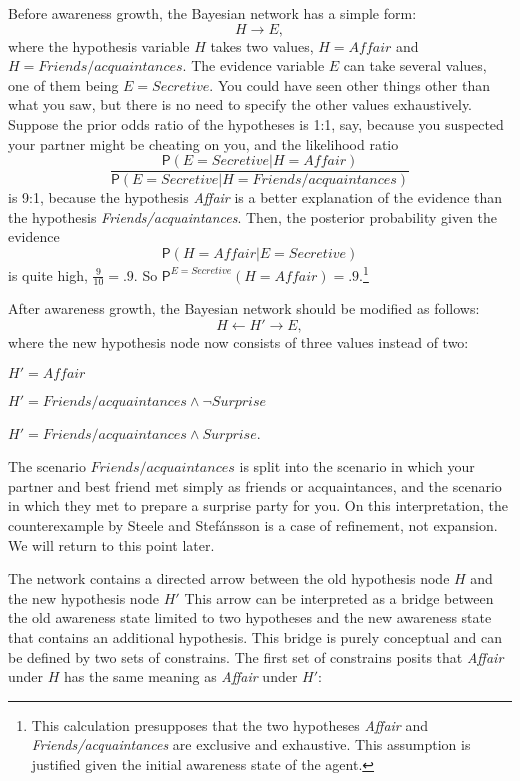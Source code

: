 \documentclass[
  11pt,
  dvipsnames,enabledeprecatedfontcommands]{scrartcl}
\newcommand{\pr}[1]{\ensuremath{\mathsf{P}(#1)}}
\newcommand{\ppr}[2]{\ensuremath{\mathsf{P}^{#1}(#2)}}
\begin{document}
Before awareness growth, the Bayesian network has a simple form:
\[H \rightarrow E,\] where the hypothesis variable \(H\) takes two
values, \(H=\textit{Affair}\) and \(H=\textit{Friends/acquaintances}\).
The evidence variable \(E\) can take several values, one of them being
\(E=\textit{Secretive}\). You could have seen other things other than
what you saw, but there is no need to specify the other values
exhaustively. Suppose the prior odds ratio of the hypotheses is 1:1,
say, because you suspected your partner might be cheating on you, and
the likelihood ratio
\[\frac{\pr{E=\textit{Secretive}\vert H=\textit{Affair}}}{\pr{E=\textit{Secretive}\vert H=\textit{Friends/acquaintances}}}\]
is 9:1, because the hypothesis \textit{Affair} is a better explanation
of the evidence than the hypothesis \textit{Friends/acquaintances}.
Then, the posterior probability given the evidence
\[\pr{H=\textit{Affair} \vert E=\textit{Secretive}}\] is quite high,
\(\frac{9}{10}=.9\). So
\(\ppr{E=\textit{Secretive}}{H=\textit{Affair}}=.9\).\footnote{This
  calculation presupposes that the two hypotheses \textit{Affair} and
  \textit{Friends/acquaintances} are exclusive and exhaustive. This
  assumption is justified given the initial awareness state of the
  agent.}

After awareness growth, the Bayesian network should be modified as
follows: \[H \leftarrow H' \rightarrow E,\] where the new hypothesis
node now consists of three values instead of two:

\(H'=\textit{Affair}\)

\(H'=\textit{Friends/acquaintances}\wedge \neg \textit{Surprise}\)

\(H'=\textit{Friends/acquaintances}\wedge\textit{Surprise}\).

\noindent The scenario \(\textit{Friends/acquaintances}\) is split into
the scenario in which your partner and best friend met simply as friends
or acquaintances, and the scenario in which they met to prepare a
surprise party for you. On this interpretation, the counterexample by
Steele and Stefánsson is a case of refinement, not expansion. We will
return to this point later.

The network contains a directed arrow between the old hypothesis node
\(H\) and the new hypothesis node \(H'\) This arrow can be interpreted
as a bridge between the old awareness state limited to two hypotheses
and the new awareness state that contains an additional hypothesis. This
bridge is purely conceptual and can be defined by two sets of
constrains. The first set of constrains posits that \textit{Affair}
under \(H\) has the same meaning as \textit{Affair} under \(H'\):
\end{document}
